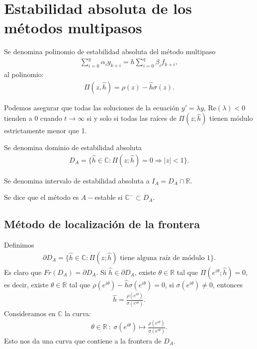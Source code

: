 \section{Estabilidad absoluta de los métodos multipasos}

\begin{defi}
    Se denomina polinomio de estabilidad absoluta del método multipaso
    \begin{align*}
        \sum_{i=0}^{q} \alpha_i y_{k+i} = h\sum_{i=0}^{q} \beta_i f_{k+i},
    \end{align*}
    al polinomio:
    \begin{align*}
        \Pi(z,\hat{h}) = \rho(z) - \hat{h}\sigma(z).
    \end{align*}
\end{defi}

\begin{obs}
    Podemos asegurar que todas las soluciones de la ecuación $y' = \lambda y$, $\text{Re}(\lambda) < 0$ tienden a 0 cuando $t \to \infty$ si y solo si todas las raíces de $\Pi(z;\hat{h})$ tienen módulo estrictamente menor que 1.
\end{obs}

\begin{defi}
    Se denomina dominio de estabilidad absoluta
    \begin{align*}
        D_A = \{ \hat{h} \in \mathbb{C} : \Pi(z;\hat{h}) = 0 \Longrightarrow|z| < 1\}.
    \end{align*}
\end{defi}

\begin{defi}
    Se denomina intervalo de estabilidad absoluta a $I_A = D_A \cap \mathbb{R}$.
\end{defi}

\begin{defi}
    Se dice que el método es $A-$estable si $\mathbb{C}^- \subset D_A$.
\end{defi}

\subsection{Método de localización de la frontera}
Definimos
\begin{align*}
    \partial D_A = \{ \hat{h} \in \mathbb{C} : \Pi(z;\hat{h}) \text{ tiene alguna raíz de módulo 1}\}.
\end{align*}
Es claro que $Fr(D_A) = \partial D_A$. Si $\hat{h} \in \partial D_A$, existe $\theta \in \mathbb{R}$ tal que $\Pi(e^{i\theta};\hat{h}) = 0$, es decir, existe $\theta \in \mathbb{R}$ tal que $\rho(e^{i\theta}) - \hat{h}\sigma(e^{i\theta}) = 0$, si $\sigma(e^{i\theta}) \not = 0$, entonces
\begin{align*}
    \hat{h} = \frac{\rho(e^{i\theta})}{\sigma(e^{i\theta})}.
\end{align*}
Consideramos en $\mathbb{C}$ la curva:
\begin{align*}
    \theta \in \mathbb{R} \ : \ \sigma(e^{i\theta}) \longmapsto \frac{\rho(e^{i\theta})}{\sigma(e^{i\theta})}.
\end{align*}
Esto nos da una curva que contiene a la frontera de $D_A$.

